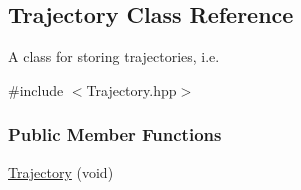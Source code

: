\hypertarget{classDmpBbo_1_1Trajectory}{\subsection{Trajectory Class Reference}
\label{classDmpBbo_1_1Trajectory}
}


A class for storing trajectories, i.\+e.  




{\ttfamily \#include $<$Trajectory.\+hpp$>$}

\subsubsection*{Public Member Functions}
\begin{DoxyCompactItemize}
\item 
\hypertarget{classDmpBbo_1_1Trajectory_aa635b61a4223224b821d156a27dbb2b8}{\hyperlink{classDmpBbo_1_1Trajectory_aa635b61a4223224b821d156a27dbb2b8}{Trajectory} (void)}\label{classDmpBbo_1_1Trajectory_aa635b61a4223224b821d156a27dbb2b8}


\end{DoxyCompactItemize}
